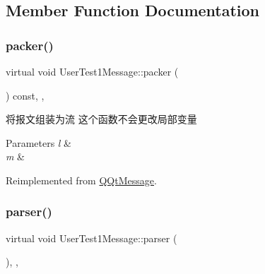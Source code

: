\subsection{Member Function Documentation}
\mbox{\label{class_user_test1_message_aa91a6b74efd42183cbb1a909fdc2b86c}} 
\subsubsection{\texorpdfstring{packer()}{packer()}}
{\footnotesize\ttfamily virtual void User\+Test1\+Message\+::packer (\begin{DoxyParamCaption}\item[{Q\+Byte\+Array \&}]{ }\end{DoxyParamCaption}) const\hspace{0.3cm}{\ttfamily [inline]}, {\ttfamily [override]}, {\ttfamily [virtual]}}



将报文组装为流 这个函数不会更改局部变量 


\begin{DoxyParams}{Parameters}
{\em l} & \\
\hline
{\em m} & \\
\hline
\end{DoxyParams}


Reimplemented from \mbox{\hyperlink{class_q_qt_message_af1885c2c3628495808dca66ee8d72e14}{Q\+Qt\+Message}}.

\mbox{\label{class_user_test1_message_a8e78ea5b1ce4acf940b796018cd22008}} 
\subsubsection{\texorpdfstring{parser()}{parser()}}
{\footnotesize\ttfamily virtual void User\+Test1\+Message\+::parser (\begin{DoxyParamCaption}\item[{const Q\+Byte\+Array \&}]{ }\end{DoxyParamCaption})\hspace{0.3cm}{\ttfamily [inline]}, {\ttfamily [override]}, {\ttfamily [virtual]}}



